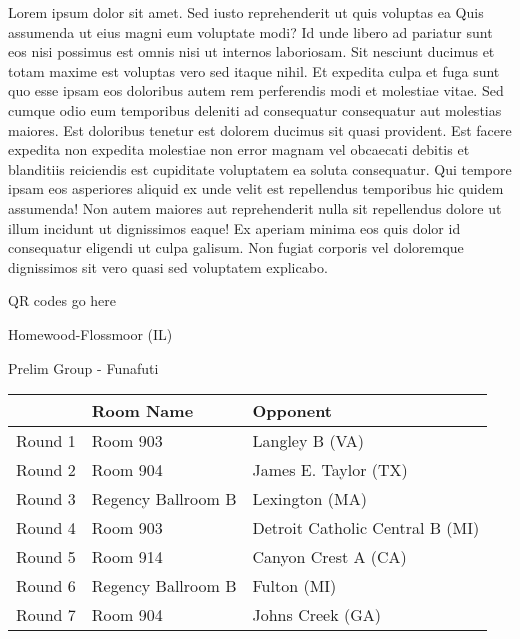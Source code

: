 \documentclass{article}%
\begin{document}
\vspace*{8pt}%
\linebreak%
\newline%
\newline%
Lorem ipsum dolor sit amet. Sed iusto reprehenderit ut quis voluptas ea Quis assumenda ut eius magni eum voluptate modi? Id unde libero ad pariatur sunt eos nisi possimus est omnis nisi ut internos laboriosam. Sit nesciunt ducimus et totam maxime est voluptas vero sed itaque nihil. Et expedita culpa et fuga sunt quo esse ipsam eos doloribus autem rem perferendis modi et molestiae vitae.\newline%
\newline%
Sed cumque odio eum temporibus deleniti ad consequatur consequatur aut molestias maiores. Est doloribus tenetur est dolorem ducimus sit quasi provident. Est facere expedita non expedita molestiae non error magnam vel obcaecati debitis et blanditiis reiciendis est cupiditate voluptatem ea soluta consequatur. Qui tempore ipsam eos asperiores aliquid ex unde velit est repellendus temporibus hic quidem assumenda!\newline%
\newline%
Non autem maiores aut reprehenderit nulla sit repellendus dolore ut illum incidunt ut dignissimos eaque! Ex aperiam minima eos quis dolor id consequatur eligendi ut culpa galisum. Non fugiat corporis vel doloremque dignissimos sit vero quasi sed voluptatem explicabo.\newline%
\newline%
%
\vspace*{30pt}%
\begin{center}%
\begin{Huge}%
QR codes go here%
\end{Huge}%
\end{center}%
\newpage%
%
\begin{center}%
\begin{Huge}%
Homewood{-}Flossmoor (IL)%
\end{Huge}%
\vspace*{8pt}%
\linebreak%
\begin{Large}%
Prelim Group {-} Funafuti%
\end{Large}%
\end{center}%
\begin{tabularx}{\textwidth}{|c|Y|Y|}%
\hline%
&Room Name&Opponent\\%
\hline%
Round 1&Room 903&Langley B (VA)\\%
Round 2&Room 904&James E. Taylor (TX)\\%
Round 3&Regency Ballroom B&Lexington (MA)\\%
Round 4&Room 903&Detroit Catholic Central B (MI)\\%
Round 5&Room 914&Canyon Crest A (CA)\\%
Round 6&Regency Ballroom B&Fulton (MI)\\%
Round 7&Room 904&Johns Creek (GA)\\%
\hline%
\end{tabularx}%
\end{document}
